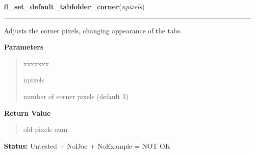 \hspace{.8\funcindent}\begin{boxedminipage}{\funcwidth}

    \raggedright \textbf{fl\_set\_default\_tabfolder\_corner}(\textit{npixels})

    \vspace{-1.5ex}

    \rule{\textwidth}{0.5\fboxrule}
\setlength{\parskip}{2ex}
    Adjusts the corner pixels, changing appearance of the tabs.

\setlength{\parskip}{1ex}
      \textbf{Parameters}
      \vspace{-1ex}

      \begin{quote}
        \begin{Ventry}{xxxxxxx}

          \item[npixels]

          number of corner pixels (default 3)

        \end{Ventry}

      \end{quote}

      \textbf{Return Value}
    \vspace{-1ex}

      \begin{quote}
      old pixels num

      \end{quote}

\textbf{Status:} Untested + NoDoc + NoExample = NOT OK



    \end{boxedminipage}

    \label{xformslib:library:fl_set_tabfolder_offset}

    \vspace{0.5ex}

